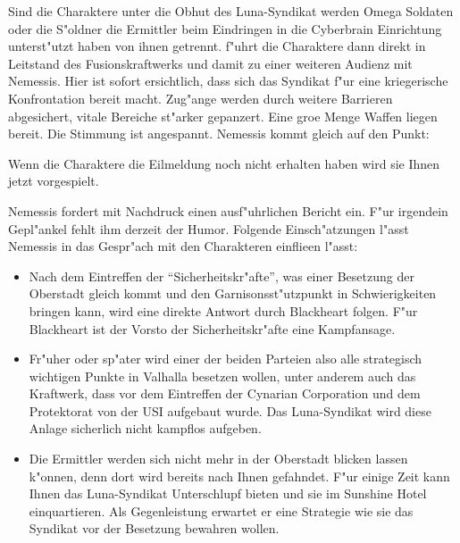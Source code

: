 Sind die Charaktere unter die Obhut des Luna-Syndikat werden Omega Soldaten oder die S"oldner die Ermittler beim Eindringen in die Cyberbrain Einrichtung unterst"utzt haben von ihnen getrennt. \xl{} f"uhrt die Charaktere dann direkt in Leitstand des Fusionskraftwerks und damit zu einer weiteren Audienz mit Nemessis. Hier ist sofort ersichtlich, dass sich das Syndikat f"ur eine kriegerische Konfrontation bereit macht. Zug"ange werden durch weitere Barrieren abgesichert, vitale Bereiche st"arker gepanzert. Eine gro\3e Menge Waffen liegen bereit. Die Stimmung ist angespannt. Nemessis kommt gleich auf den Punkt: 


Wenn die Charaktere die Eilmeldung noch nicht erhalten haben wird sie Ihnen jetzt vorgespielt.


Nemessis fordert mit Nachdruck einen ausf"uhrlichen Bericht ein. F"ur irgendein Gepl"ankel fehlt ihm derzeit der Humor. Folgende Einsch"atzungen l"asst Nemessis in das Gespr"ach mit den Charakteren einflie\3en l"asst:

\begin{itemize}
	\item Nach dem Eintreffen der "`Sicherheitskr"afte"', was einer Besetzung der Oberstadt gleich kommt und den 			
		Garnisonsst"utzpunkt in Schwierigkeiten bringen kann, wird eine direkte Antwort durch Blackheart folgen. F"ur Blackheart ist der Vorsto\3 der Sicherheitskr"afte eine Kampfansage.
	\item Fr"uher oder sp"ater wird einer der beiden Parteien also alle strategisch wichtigen Punkte in Valhalla besetzen wollen, unter 	
		anderem auch das Kraftwerk, dass vor dem Eintreffen der Cynarian Corporation und dem Protektorat von der USI aufgebaut wurde. Das Luna-Syndikat wird diese Anlage sicherlich nicht kampflos aufgeben.
		\item Die Ermittler werden sich nicht mehr in der Oberstadt blicken lassen k"onnen, denn dort wird bereits nach Ihnen gefahndet. F"ur 
		einige Zeit kann Ihnen das Luna-Syndikat Unterschlupf bieten und sie im Sunshine Hotel einquartieren. Als Gegenleistung erwartet er eine Strategie wie sie das Syndikat vor der Besetzung bewahren wollen.			
\end{itemize}

